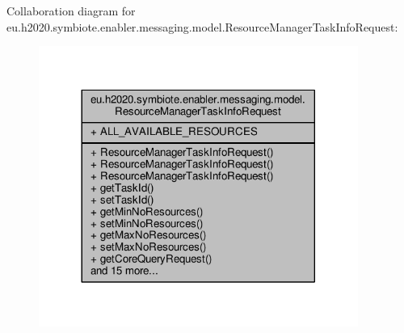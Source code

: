 Collaboration diagram for eu.\+h2020.\+symbiote.\+enabler.\+messaging.\+model.\+Resource\+Manager\+Task\+Info\+Request\+:
\nopagebreak
\begin{figure}[H]
\begin{center}
\leavevmode
\includegraphics[width=296pt]{classeu_1_1h2020_1_1symbiote_1_1enabler_1_1messaging_1_1model_1_1ResourceManagerTaskInfoRequest__coll__graph}
\end{center}
\end{figure}
